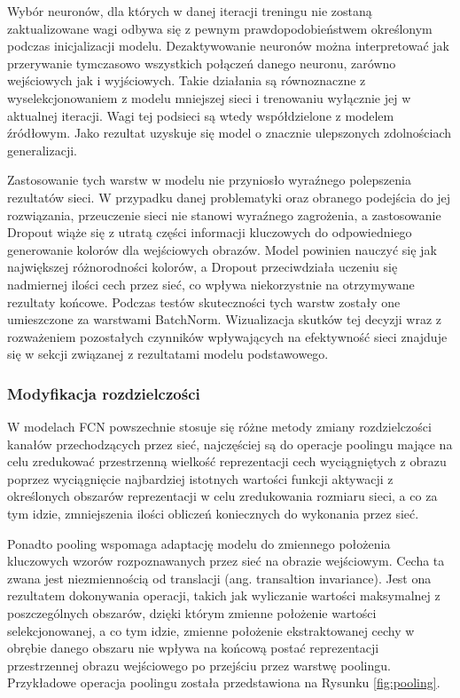   Wybór neuronów, dla których w danej iteracji treningu nie zostaną
  zaktualizowane wagi odbywa się z pewnym prawdopodobieństwem określonym
  podczas inicjalizacji modelu. Dezaktywowanie neuronów można interpretować jak
  przerywanie tymczasowo wszystkich połączeń danego neuronu, zarówno wejściowych
  jak i wyjściowych. Takie działania są równoznaczne z wyselekcjonowaniem z modelu
  mniejszej sieci i trenowaniu wyłącznie jej w aktualnej iteracji. Wagi tej
  podsieci są wtedy współdzielone z modelem źródłowym.
  Jako rezultat uzyskuje się model o znacznie ulepszonych zdolnościach generalizacji.

  Zastosowanie tych warstw w modelu nie przyniosło wyraźnego polepszenia rezultatów
  sieci. W przypadku danej problematyki oraz obranego podejścia do jej rozwiązania,
  przeuczenie sieci nie stanowi wyraźnego zagrożenia, a zastosowanie Dropout
  wiąże się z utratą części informacji kluczowych do odpowiedniego
  generowanie kolorów dla wejściowych obrazów. Model powinien nauczyć się jak
  największej różnorodności kolorów, a Dropout przeciwdziała uczeniu się
  nadmiernej ilości cech przez sieć, co wpływa niekorzystnie na otrzymywane
  rezultaty końcowe. Podczas testów skuteczności tych warstw zostały one umieszczone
  za warstwami BatchNorm. Wizualizacja skutków tej decyzji wraz z rozważeniem
  pozostałych czynników wpływających na efektywność sieci znajduje się w
  sekcji związanej z rezultatami modelu podstawowego.

  \subsubsection{Modyfikacja rozdzielczości}

  W modelach FCN powszechnie stosuje się różne metody zmiany rozdzielczości
  kanałów przechodzących przez sieć, najczęściej są do operacje poolingu mające
  na celu zredukować przestrzenną wielkość reprezentacji cech wyciągniętych z
  obrazu poprzez wyciągnięcie najbardziej istotnych wartości funkcji aktywacji z
  określonych obszarów reprezentacji w celu zredukowania rozmiaru
  sieci, a co za tym idzie, zmniejszenia ilości obliczeń koniecznych do wykonania
  przez sieć.

  Ponadto pooling wspomaga adaptację modelu do zmiennego położenia
  kluczowych wzorów rozpoznawanych przez sieć na obrazie wejściowym. Cecha ta
  zwana jest niezmiennością od translacji (ang. transaltion invariance). Jest
  ona rezultatem dokonywania operacji, takich jak wyliczanie wartości maksymalnej
  z poszczególnych obszarów, dzięki którym zmienne położenie wartości
  selekcjonowanej, a co tym idzie, zmienne położenie ekstraktowanej cechy w obrębie
  danego obszaru nie wpływa na końcową postać reprezentacji przestrzennej obrazu
  wejściowego po przejściu przez warstwę poolingu. Przykładowe operacja poolingu
  została przedstawiona na Rysunku \ref{fig:pooling}.


